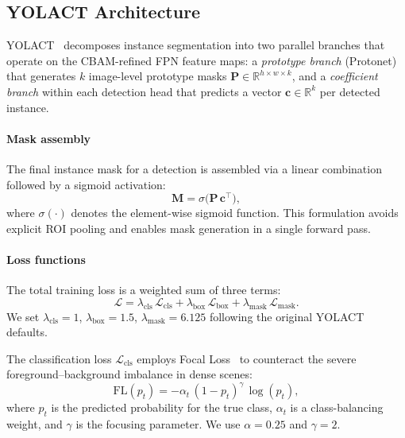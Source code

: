 \documentclass[conference]{IEEEtran}
\begin{document}
\subsection{YOLACT Architecture}
\label{sec:yolact}

YOLACT~\cite{bolya2019yolact} decomposes instance segmentation into two
parallel branches that operate on the CBAM-refined FPN feature maps: a
\emph{prototype branch} (Protonet) that generates $k$ image-level
prototype masks $\mathbf{P} \in \mathbb{R}^{h \times w \times k}$, and a
\emph{coefficient branch} within each detection head that predicts a
vector $\mathbf{c} \in \mathbb{R}^{k}$ per detected instance.

\paragraph{Mask assembly}
The final instance mask for a detection is assembled via a linear
combination followed by a sigmoid activation:
\begin{equation}
  \mathbf{M} = \sigma\!\bigl(\mathbf{P}\,\mathbf{c}^{\!\top}\bigr),
  \label{eq:mask}
\end{equation}
where $\sigma(\cdot)$ denotes the element-wise sigmoid function. This
formulation avoids explicit ROI pooling and enables mask generation in a
single forward pass.

\paragraph{Loss functions}
The total training loss is a weighted sum of three terms:
\begin{equation}
  \mathcal{L} = \lambda_{\text{cls}}\,\mathcal{L}_{\text{cls}}
              + \lambda_{\text{box}}\,\mathcal{L}_{\text{box}}
              + \lambda_{\text{mask}}\,\mathcal{L}_{\text{mask}}.
  \label{eq:total_loss}
\end{equation}
We set $\lambda_{\text{cls}} = 1$, $\lambda_{\text{box}} = 1.5$,
$\lambda_{\text{mask}} = 6.125$ following the original YOLACT defaults.

The classification loss $\mathcal{L}_{\text{cls}}$ employs Focal
Loss~\cite{lin2017focal} to counteract the severe foreground--background
imbalance in dense scenes:
\begin{equation}
  \text{FL}(p_t) = -\alpha_t\,(1 - p_t)^{\gamma}\,\log(p_t),
  \label{eq:focal}
\end{equation}
where $p_t$ is the predicted probability for the true class, $\alpha_t$ is
a class-balancing weight, and $\gamma$ is the focusing parameter. We use
$\alpha = 0.25$ and $\gamma = 2$.
\end{document}
